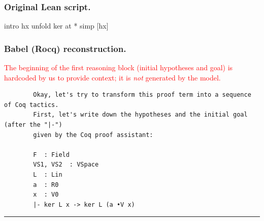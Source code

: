 \documentclass{article}
\theoremstyle{plain}
\theoremstyle{definition}
\theoremstyle{remark}
\begin{document}
	\subsubsection*{Original Lean script.}
	\begin{rocq}
		intro hx
		unfold ker at *
		simp [hx]
	\end{rocq}
	
	
	\subsubsection*{Babel (Rocq) reconstruction.}
	
	\noindent\textcolor{red}{The beginning of the first reasoning block (initial hypotheses and goal) is hardcoded by us to provide context; it is \emph{not} generated by the model.}
	
        \begin{small}
	\begin{verbatim}
		Okay, let's try to transform this proof term into a sequence of Coq tactics.
		First, let's write down the hypotheses and the initial goal (after the "|-") 
		given by the Coq proof assistant:
		
		F  : Field
		VS1, VS2  : VSpace
		L  : Lin
		a  : R0
		x  : V0
		|- ker L x -> ker L (a •V x)
	\end{verbatim}
        \end{small}
	
	\noindent\rule{6cm}{0.4pt}
	
\end{document}
